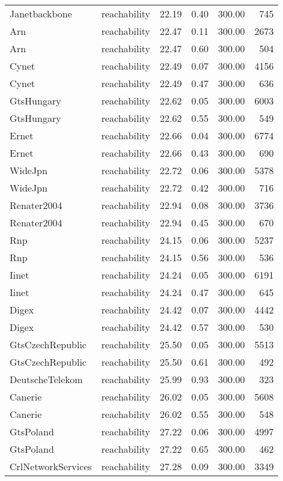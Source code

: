 \begin{tabular}{llrrrr}
Janetbackbone & reachability & 22.19 & 0.40 & 300.00 & 745 \\
Arn & reachability & 22.47 & 0.11 & 300.00 & 2673 \\
Arn & reachability & 22.47 & 0.60 & 300.00 & 504 \\
Cynet & reachability & 22.49 & 0.07 & 300.00 & 4156 \\
Cynet & reachability & 22.49 & 0.47 & 300.00 & 636 \\
GtsHungary & reachability & 22.62 & 0.05 & 300.00 & 6003 \\
GtsHungary & reachability & 22.62 & 0.55 & 300.00 & 549 \\
Ernet & reachability & 22.66 & 0.04 & 300.00 & 6774 \\
Ernet & reachability & 22.66 & 0.43 & 300.00 & 690 \\
WideJpn & reachability & 22.72 & 0.06 & 300.00 & 5378 \\
WideJpn & reachability & 22.72 & 0.42 & 300.00 & 716 \\
Renater2004 & reachability & 22.94 & 0.08 & 300.00 & 3736 \\
Renater2004 & reachability & 22.94 & 0.45 & 300.00 & 670 \\
Rnp & reachability & 24.15 & 0.06 & 300.00 & 5237 \\
Rnp & reachability & 24.15 & 0.56 & 300.00 & 536 \\
Iinet & reachability & 24.24 & 0.05 & 300.00 & 6191 \\
Iinet & reachability & 24.24 & 0.47 & 300.00 & 645 \\
Digex & reachability & 24.42 & 0.07 & 300.00 & 4442 \\
Digex & reachability & 24.42 & 0.57 & 300.00 & 530 \\
GtsCzechRepublic & reachability & 25.50 & 0.05 & 300.00 & 5513 \\
GtsCzechRepublic & reachability & 25.50 & 0.61 & 300.00 & 492 \\
DeutscheTelekom & reachability & 25.99 & 0.93 & 300.00 & 323 \\
Canerie & reachability & 26.02 & 0.05 & 300.00 & 5608 \\
Canerie & reachability & 26.02 & 0.55 & 300.00 & 548 \\
GtsPoland & reachability & 27.22 & 0.06 & 300.00 & 4997 \\
GtsPoland & reachability & 27.22 & 0.65 & 300.00 & 462 \\
CrlNetworkServices & reachability & 27.28 & 0.09 & 300.00 & 3349 \\

\end{tabular}
